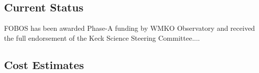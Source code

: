 \subsection{Current Status}

FOBOS has been awarded Phase-A funding by WMKO Observatory and received the full endorsement of the Keck Science Steering Committee....


\subsection{Cost Estimates}






